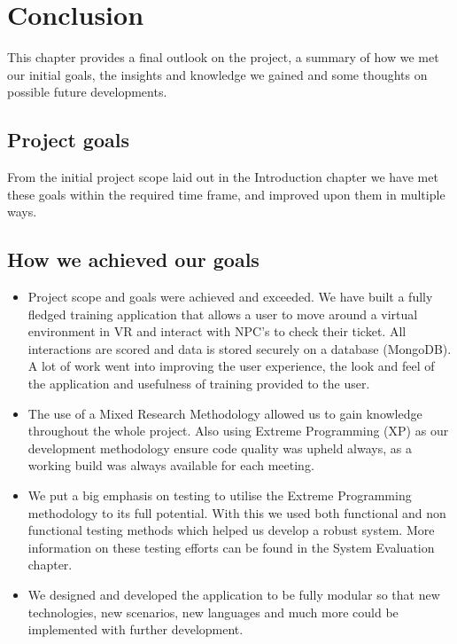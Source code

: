 \chapter{Conclusion}
This chapter provides a final outlook on the project, a summary of how we met our initial goals, the insights and knowledge we gained and some thoughts on possible future developments.

\section{Project goals}
From the initial project scope laid out in the Introduction chapter we have met these goals within the required time frame, and improved upon them in multiple ways.

\section{How we achieved our goals}
\begin{itemize}
    \item Project scope and goals were achieved and exceeded. We have built a fully fledged training application that allows a user to move around a virtual environment in VR and interact with NPC's to check their ticket. All interactions are scored and data is stored securely on a database (MongoDB). A lot of work went into improving the user experience, the look and feel of the application and usefulness of training provided to the user. 

    \item The use of a Mixed Research Methodology allowed us to gain knowledge throughout the whole project. Also using Extreme Programming (XP) as our development methodology ensure code quality was upheld always, as a working build was always available for each meeting.
    
    \item We put a big emphasis on testing to utilise the Extreme Programming methodology to its full potential. With this we used both functional and non functional testing methods which helped us develop a robust system. More information on these testing efforts can be found in the System Evaluation chapter.
    
    \item We designed and developed the application to be fully modular so that new technologies, new scenarios, new languages and much more could be implemented with further development.

\end{itemize}


